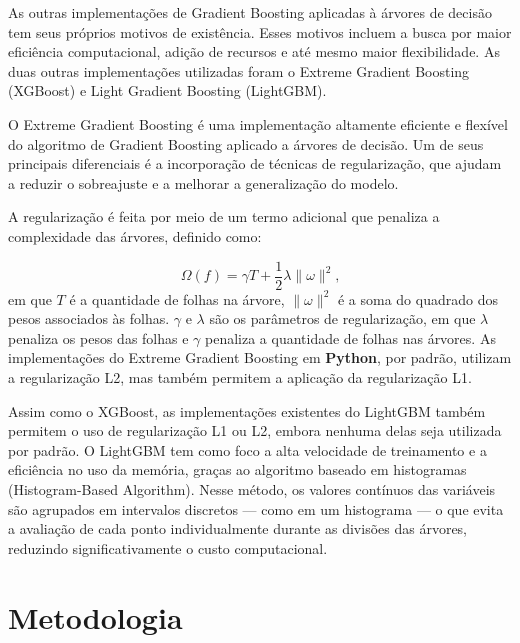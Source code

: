 \documentclass[
  12pt,
  a4paper,
]{scrreprt}
\begin{document}
\vspace{12pt}

As outras implementações de Gradient Boosting aplicadas à árvores de
decisão tem seus próprios motivos de existência. Esses motivos incluem a
busca por maior eficiência computacional, adição de recursos e até mesmo
maior flexibilidade. As duas outras implementações utilizadas foram o
Extreme Gradient Boosting (XGBoost) e Light Gradient Boosting
(LightGBM).

\vspace{12pt}

O Extreme Gradient Boosting é uma implementação altamente eficiente e
flexível do algoritmo de Gradient Boosting aplicado a árvores de
decisão. Um de seus principais diferenciais é a incorporação de técnicas
de regularização, que ajudam a reduzir o sobreajuste e a melhorar a
generalização do modelo.

\vspace{12pt}

A regularização é feita por meio de um termo adicional que penaliza a
complexidade das árvores, definido como:

\[
\Omega\left(f\right) = \gamma T + \frac{1}{2}\lambda\|\omega\|^{2}\text{,}
\] em que \(T\) é a quantidade de folhas na árvore, \(\|\omega\|^{2}\) é
a soma do quadrado dos pesos associados às folhas. \(\gamma\) e
\(\lambda\) são os parâmetros de regularização, em que \(\lambda\)
penaliza os pesos das folhas e \(\gamma\) penaliza a quantidade de
folhas nas árvores. As implementações do Extreme Gradient Boosting em
\textbf{Python}, por padrão, utilizam a regularização L2, mas também
permitem a aplicação da regularização L1.

\vspace{12pt}

Assim como o XGBoost, as implementações existentes do LightGBM também
permitem o uso de regularização L1 ou L2, embora nenhuma delas seja
utilizada por padrão. O LightGBM tem como foco a alta velocidade de
treinamento e a eficiência no uso da memória, graças ao algoritmo
baseado em histogramas (Histogram-Based Algorithm). Nesse método, os
valores contínuos das variáveis são agrupados em intervalos discretos
--- como em um histograma --- o que evita a avaliação de cada ponto
individualmente durante as divisões das árvores, reduzindo
significativamente o custo computacional.

\chapter{Metodologia}\label{metodologia}
\end{document}
